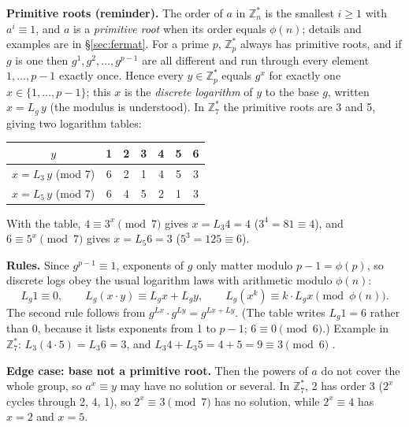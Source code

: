 \textbf{Primitive roots (reminder).} The order of $a$ in $\mathbb{Z}_n^*$ is the smallest $i \ge 1$ with $a^i \equiv 1$, and $a$ is a \emph{primitive root} when its order equals $\phi(n)$; details and examples are in \S\ref{sec:fermat}. For a prime $p$, $\mathbb{Z}_p^*$ always has primitive roots, and if $g$ is one then $g^1, g^2, \dots, g^{p-1}$ are all different and run through every element $1, \dots, p - 1$ exactly once. Hence every $y \in \mathbb{Z}_p^*$ equals $g^x$ for exactly one $x \in \{1, \dots, p - 1\}$; this $x$ is the \emph{discrete logarithm} of $y$ to the base $g$, written $x = L_g\, y$ (the modulus is understood). In $\mathbb{Z}_7^*$ the primitive roots are 3 and 5, giving two logarithm tables:
\begin{center}\small
\begin{tabular}{@{}c|cccccc@{}}
$y$ & 1&2&3&4&5&6\\ \midrule
$x = L_3\, y$ (mod 7) & 6&2&1&4&5&3\\
$x = L_5\, y$ (mod 7) & 6&4&5&2&1&3\\
\end{tabular}
\end{center}
With the table, $4 \equiv 3^x \pmod 7$ gives $x = L_3 4 = 4$ ($3^4 = 81 \equiv 4$), and $6 \equiv 5^x \pmod 7$ gives $x = L_5 6 = 3$ ($5^3 = 125 \equiv 6$).

\textbf{Rules.} Since $g^{p-1} \equiv 1$, exponents of $g$ only matter modulo $p - 1 = \phi(p)$, so discrete logs obey the usual logarithm laws with arithmetic modulo $\phi(n)$:
\[
L_g 1 \equiv 0, \qquad L_g(x \cdot y) \equiv L_g x + L_g y, \qquad L_g(x^k) \equiv k \cdot L_g x \pmod{\phi(n)}.
\]
The second rule follows from $g^{L x} \cdot g^{L y} = g^{L x + L y}$. (The table writes $L_g 1 = 6$ rather than 0, because it lists exponents from 1 to $p - 1$; $6 \equiv 0 \pmod 6$.) Example in $\mathbb{Z}_7^*$: $L_3(4 \cdot 5) = L_3 6 = 3$, and $L_3 4 + L_3 5 = 4 + 5 = 9 \equiv 3 \pmod 6$ \checkmark.

\textbf{Edge case: base not a primitive root.} Then the powers of $a$ do not cover the whole group, so $a^x \equiv y$ may have no solution or several. In $\mathbb{Z}_7^*$, 2 has order 3 ($2^x$ cycles through 2, 4, 1), so $2^x \equiv 3 \pmod 7$ has no solution, while $2^x \equiv 4$ has $x = 2$ and $x = 5$.

